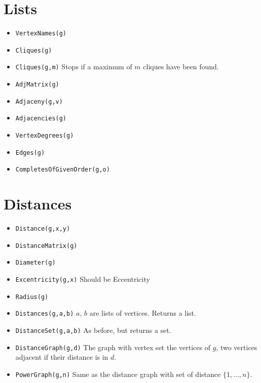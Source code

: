\documentclass[11pt]{article}
\begin{document}
\begin{multicols}{3}
\section{Lists}
\label{sec-10}
\begin{itemize}
\item \verb~VertexNames(g)~
\item \verb~Cliques(g)~
\item \verb~Cliques(g,m)~ Stops if a maximum of \(m\) cliques have been found.
\item \verb~AdjMatrix(g)~
\item \verb~Adjaceny(g,v)~
\item \verb~Adjacencies(g)~
\item \verb~VertexDegrees(g)~
\item \verb~Edges(g)~
\item \verb~CompletesOfGivenOrder(g,o)~
\end{itemize}

\section{Distances}
\label{sec-11}
\begin{itemize}
\item \verb~Distance(g,x,y)~
\item \verb~DistanceMatrix(g)~
\item \verb~Diameter(g)~
\item \verb~Excentricity(g,x)~ Should be Eccentricity
\item \verb~Radius(g)~
\item \verb~Distances(g,a,b)~ \(a\), \(b\) are lists of vertices. Returns a list.
\item \verb~DistanceSet(g,a,b)~ As before, but returns a set.
\item \verb~DistanceGraph(g,d)~ The graph with vertex set the vertices of
\(g\), two vertices adjacent if their distance is in \(d\).
\item \verb~PowerGraph(g,n)~ Same as the distance graph with set of distance
\(\{1,\ldots,n\}\).
\end{itemize}

\end{multicols}
\end{document}
